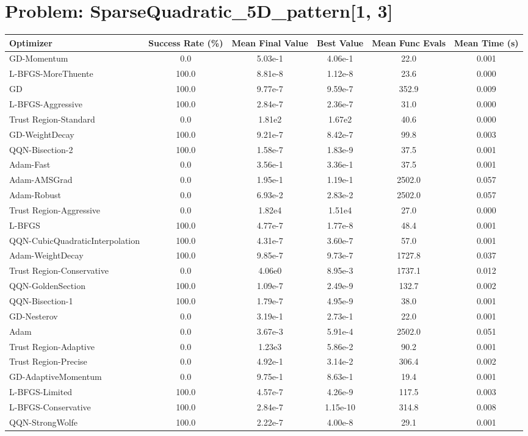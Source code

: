 \documentclass{article}
\begin{document}
\section{Problem: SparseQuadratic\_5D\_pattern[1, 3]}
\begin{longtable}{p{3cm}*{5}{c}}
\toprule
\textbf{Optimizer} & \textbf{Success Rate (\%)} & \textbf{Mean Final Value} & \textbf{Best Value} & \textbf{Mean Func Evals} & \textbf{Mean Time (s)} \\
\midrule
GD-Momentum & 0.0 & 5.03e-1 & 4.06e-1 & 22.0 & 0.001 \\
L-BFGS-MoreThuente & 100.0 & 8.81e-8 & 1.12e-8 & 23.6 & 0.000 \\
GD & 100.0 & 9.77e-7 & 9.59e-7 & 352.9 & 0.009 \\
L-BFGS-Aggressive & 100.0 & 2.84e-7 & 2.36e-7 & 31.0 & 0.000 \\
Trust Region-Standard & 0.0 & 1.81e2 & 1.67e2 & 40.6 & 0.000 \\
GD-WeightDecay & 100.0 & 9.21e-7 & 8.42e-7 & 99.8 & 0.003 \\
QQN-Bisection-2 & 100.0 & 1.58e-7 & 1.83e-9 & 37.5 & 0.001 \\
Adam-Fast & 0.0 & 3.56e-1 & 3.36e-1 & 37.5 & 0.001 \\
Adam-AMSGrad & 0.0 & 1.95e-1 & 1.19e-1 & 2502.0 & 0.057 \\
Adam-Robust & 0.0 & 6.93e-2 & 2.83e-2 & 2502.0 & 0.057 \\
Trust Region-Aggressive & 0.0 & 1.82e4 & 1.51e4 & 27.0 & 0.000 \\
L-BFGS & 100.0 & 4.77e-7 & 1.77e-8 & 48.4 & 0.001 \\
QQN-CubicQuadraticInterpolation & 100.0 & 4.31e-7 & 3.60e-7 & 57.0 & 0.001 \\
Adam-WeightDecay & 100.0 & 9.85e-7 & 9.73e-7 & 1727.8 & 0.037 \\
Trust Region-Conservative & 0.0 & 4.06e0 & 8.95e-3 & 1737.1 & 0.012 \\
QQN-GoldenSection & 100.0 & 1.09e-7 & 2.49e-9 & 132.7 & 0.002 \\
QQN-Bisection-1 & 100.0 & 1.79e-7 & 4.95e-9 & 38.0 & 0.001 \\
GD-Nesterov & 0.0 & 3.19e-1 & 2.73e-1 & 22.0 & 0.001 \\
Adam & 0.0 & 3.67e-3 & 5.91e-4 & 2502.0 & 0.051 \\
Trust Region-Adaptive & 0.0 & 1.23e3 & 5.86e-2 & 90.2 & 0.001 \\
Trust Region-Precise & 0.0 & 4.92e-1 & 3.14e-2 & 306.4 & 0.002 \\
GD-AdaptiveMomentum & 0.0 & 9.75e-1 & 8.63e-1 & 19.4 & 0.001 \\
L-BFGS-Limited & 100.0 & 4.57e-7 & 4.26e-9 & 117.5 & 0.003 \\
L-BFGS-Conservative & 100.0 & 2.84e-7 & 1.15e-10 & 314.8 & 0.008 \\
QQN-StrongWolfe & 100.0 & 2.22e-7 & 4.00e-8 & 29.1 & 0.001 \\
\bottomrule
\end{longtable}
\end{document}
